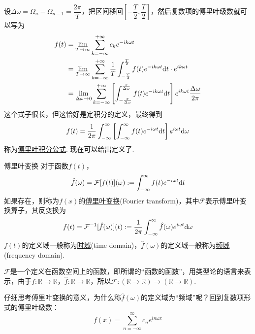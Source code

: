 \documentclass[main.tex]{subfiles}
\begin{document}
设\(\Delta\omega=\Omega_n-\Omega_{n-1}=\dfrac{2\pi}{T}\)，把区间移回\([-\dfrac{T}{2},\dfrac{T}{2}]\)，然后复数项的傅里叶级数就可以写为
\begin{align*}
    f(t) &= \lim_{T \to \infty}\sum_{k=-\infty}^{+\infty}c_ke^{-ik\omega t} \\
    &= \lim_{T \to \infty}\sum_{k=-\infty}^{+\infty}\frac{1}{T} \int_{-\frac{T}{2}}^{\frac{T}{2}}f(t)e^{-ik\omega t}{\rm d}t\cdot e^{ik\omega t} \\
    &= \lim_{\Delta\omega \to 0}\sum_{k=-\infty}^{+\infty} \left[\int_{-\frac{\pi}{\Delta\omega}}^{\frac{\pi}{\Delta\omega}}f(t)e^{-ik\omega t}{\rm d}t \right]e^{ik\omega t}\frac{\Delta\omega}{2\pi}
\end{align*}
这个式子很长，但这恰好是定积分的定义，最终得到
\[ f(t) = \frac{1}{2\pi}\int_{-\infty}^{\infty} \left[\int_{-\infty}^{\infty}f(t)e^{-i\omega t}{\rm d}t \right]e^{i\omega t}{\rm d}\omega \]
称为\uline{傅里叶积分公式}. 现在可以给出定义了.

\begin{definition}{傅里叶变换}
    对于函数\(f(t)\)，
    \[\hat{f}(\omega) = \mathcal{F}[f(t)](\omega) := \int_{-\infty}^{\infty}f(t)e^{-i\omega t}{\rm d}t\]
    如果存在，则称为\(f(x)\)的\uline{傅里叶变换}(Fourier transform)，其中\(\mathcal{F}\)表示傅里叶变换算子，其反变换为
    \[f(t) = \mathcal{F}^{-1}[\hat{f}(\omega)](t) := \frac{1}{2\pi}\int_{-\infty}^{\infty}\hat{f}(\omega)e^{i\omega t}{\rm d}\omega\]
    \(f(t)\)的定义域一般称为\uline{时域}(time domain)，\(\hat{f}(\omega)\)的定义域一般称为\uline{频域}(frequency domain).
\end{definition}
\(\mathcal{F}\)是一个定义在函数空间上的函数，即所谓的“函数的函数”，用类型论的语言来表示，由于\(f:\mathbb{R}\to\mathbb{R}\)，\(\hat{f}:\mathbb{R}\to\mathbb{R}\)，所以\(\mathcal{F}:(\mathbb{R}\to\mathbb{R})\to(\mathbb{R}\to\mathbb{R})\). 

\vspace{1cm}

仔细思考傅里叶变换的意义，为什么称\(\hat{f}(\omega)\)的定义域为“频域”呢？回到复数项形式的傅里叶级数：
\[f(x) = \sum_{n=-\infty}^{\infty}c_ne^{in\omega x}\]
\end{document}

